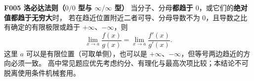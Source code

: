 \textbf{F005 洛必达法则（$0/0$ 型与 $\infty/\infty$ 型）}\quad
当分子、分母\textbf{都趋于 $0$}，或它们的\textbf{绝对值都趋于无穷大}时，
若在趋近位置附近二者可导、分母导数不为 $0$，且导数之比有确定的有限极限或趋于 $+\infty$、$-\infty$，则
\[
\boxed{\displaystyle
\lim_{x\to a}\frac{f(x)}{g(x)}
=\lim_{x\to a}\frac{f'(x)}{g'(x)}.}
\]
这里 $a$ 可以是有限位置（可取单侧），也可以是 $+\infty$、$-\infty$，但等号两边趋近的方向必须一致。
高中常见题应优先考虑约分、有理化与最高次项比较；本结论不可脱离使用条件机械套用。
